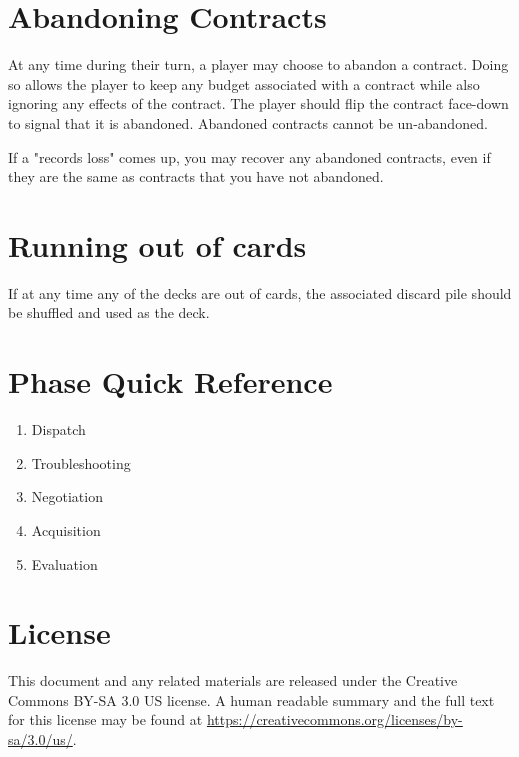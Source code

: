 \documentclass[twocolumn]{article}
\begin{document}
\section*{Abandoning Contracts}

At any time during their turn, a player may choose to abandon a contract. Doing so allows the player to keep any budget associated with a contract while also ignoring any effects of the contract. The player should flip the contract face-down to signal that it is abandoned. Abandoned contracts cannot be un-abandoned.

If a "records loss" comes up, you may recover any abandoned contracts, even if they are the same as contracts that you have not abandoned.

\section*{Running out of cards}

If at any time any of the decks are out of cards, the associated discard pile should be shuffled and used as the deck.

\section*{Phase Quick Reference}

\begin{enumerate}
	\item Dispatch
	\item Troubleshooting
	\item Negotiation
	\item Acquisition
	\item Evaluation
\end{enumerate}

\section*{License}

This document and any related materials are released under the Creative Commons BY-SA 3.0 US license. A human readable summary and the full text for this license may be found at \url{https://creativecommons.org/licenses/by-sa/3.0/us/}.
\end{document}
